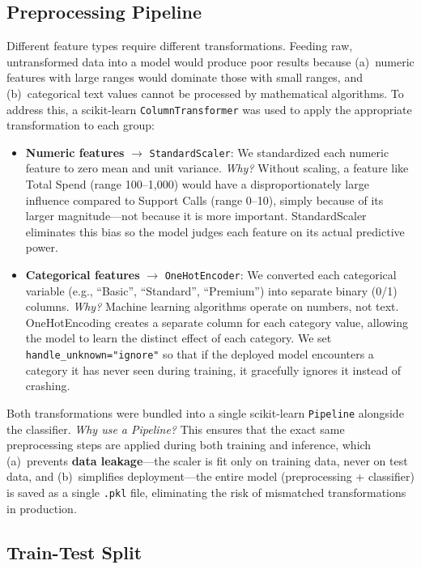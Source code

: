 \documentclass[12pt, a4paper]{article}
\begin{document}
\subsection{Preprocessing Pipeline}

Different feature types require different transformations. Feeding raw, untransformed data into a model would produce poor results because (a)~numeric features with large ranges would dominate those with small ranges, and (b)~categorical text values cannot be processed by mathematical algorithms. To address this, a scikit-learn \texttt{ColumnTransformer} was used to apply the appropriate transformation to each group:

\begin{itemize}
    \item \textbf{Numeric features} $\rightarrow$ \texttt{StandardScaler}: We standardized each numeric feature to zero mean and unit variance. \textit{Why?} Without scaling, a feature like Total Spend (range 100--1,000) would have a disproportionately large influence compared to Support Calls (range 0--10), simply because of its larger magnitude---not because it is more important. StandardScaler eliminates this bias so the model judges each feature on its actual predictive power.
    \item \textbf{Categorical features} $\rightarrow$ \texttt{OneHotEncoder}: We converted each categorical variable (e.g., ``Basic'', ``Standard'', ``Premium'') into separate binary (0/1) columns. \textit{Why?} Machine learning algorithms operate on numbers, not text. OneHotEncoding creates a separate column for each category value, allowing the model to learn the distinct effect of each category. We set \texttt{handle\_unknown="ignore"} so that if the deployed model encounters a category it has never seen during training, it gracefully ignores it instead of crashing.
\end{itemize}

Both transformations were bundled into a single scikit-learn \texttt{Pipeline} alongside the classifier. \textit{Why use a Pipeline?} This ensures that the exact same preprocessing steps are applied during both training and inference, which (a)~prevents \textbf{data leakage}---the scaler is fit only on training data, never on test data, and (b)~simplifies deployment---the entire model (preprocessing + classifier) is saved as a single \texttt{.pkl} file, eliminating the risk of mismatched transformations in production.

\subsection{Train-Test Split}
\end{document}
